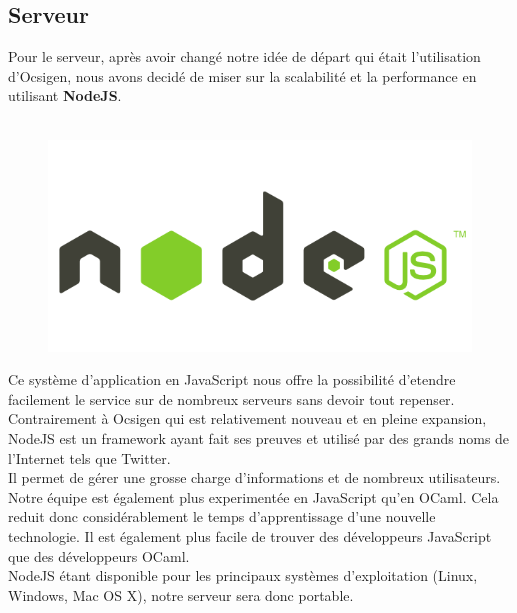 \documentclass{life-fr}
\begin{document}
\subsection{Serveur}

Pour le serveur, après avoir changé notre idée de départ qui était l'utilisation d'Ocsigen, nous avons decidé de miser sur la scalabilité et la performance en utilisant \textbf{NodeJS}.\\
\\


\begin{figure}[H]
  \begin{center}
    \includegraphics[width=13cm]{img/nodejs.png}
  \end{center}
\end{figure}

Ce système d'application en JavaScript nous offre la possibilité d'etendre facilement le service sur de nombreux serveurs sans devoir tout repenser.\\

Contrairement à Ocsigen qui est relativement nouveau et en pleine expansion, NodeJS est un framework ayant fait ses preuves et utilisé par des grands noms de l'Internet tels que Twitter.\\
Il permet de gérer une grosse charge d'informations et de nombreux utilisateurs.\\

Notre équipe est également plus experimentée en JavaScript qu'en OCaml. Cela reduit donc considérablement le temps d'apprentissage d'une nouvelle technologie. Il est également plus facile de trouver des développeurs JavaScript que des développeurs OCaml.\\

NodeJS étant disponible pour les principaux systèmes d'exploitation (Linux, Windows, Mac OS X), notre serveur sera donc portable.
\end{document}
